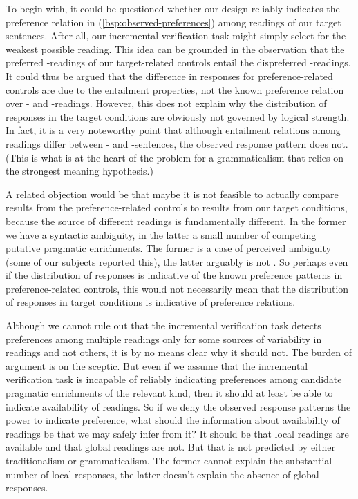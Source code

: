 \documentclass[fleqn,reqno,10pt,draft]{article}
\newcommand{\as}{\acro{as}}
\renewcommand{\es}{\acro{es}}
\newcommand{\lc}{\acro{lc}}
\newcommand{\ec}{\acro{ec}}
\begin{document}
To begin with, it could be questioned whether our design reliably
indicates the preference relation in (\ref{bsp:observed-preferences})
among readings of our target sentences. After all, our incremental
verification task might simply select for the weakest possible
reading. This idea can be grounded in the observation that the
preferred \lc-readings of our target-related controls entail the
dispreferred \ec-readings. It could thus be argued that the difference
in responses for preference-related controls are due to the entailment
properties, not the known preference relation over \lc- and
\ec-readings. However, this does not explain why the distribution of
responses in the target conditions are obviously not governed by
logical strength. In fact, it is a very noteworthy point that although
entailment relations among readings differ between \as- and
\es-sentences, the observed response pattern does not. (This is what
is at the heart of the problem for a grammaticalism that relies on the
strongest meaning hypothesis.)

A related objection would be that maybe it is not feasible to actually
compare results from the preference-related controls to results from
our target conditions, because the source of different readings is
fundamentally different. In the former we have a syntactic ambiguity,
in the latter a small number of competing putative pragmatic
enrichments. The former is a case of perceived ambiguity (some of our
subjects reported this), the latter arguably is not
\citep[c.f.][]{GeurtsPouscoulous2009:Embedded-Implic}. So perhaps even
if the distribution of responses is indicative of the known preference
patterns in preference-related controls, this would not necessarily
mean that the distribution of responses in target conditions is
indicative of preference relations.

Although we cannot rule out that the incremental verification task
detects preferences among multiple readings only for some sources of
variability in readings and not others, it is by no means clear why it
should not. The burden of argument is on the sceptic. But even if we
assume that the incremental verification task is incapable of reliably
indicating preferences among candidate pragmatic enrichments of the
relevant kind, then it should at least be able to indicate
availability of readings. So if we deny the observed response patterns
the power to indicate preference, what should the information about
availability of readings be that we may safely infer from it? It
should be that local readings are available and that global readings
are not. But that is not predicted by either traditionalism or
grammaticalism. The former cannot explain the substantial number of
local responses, the latter doesn't explain the absence of global
responses.
\end{document}
